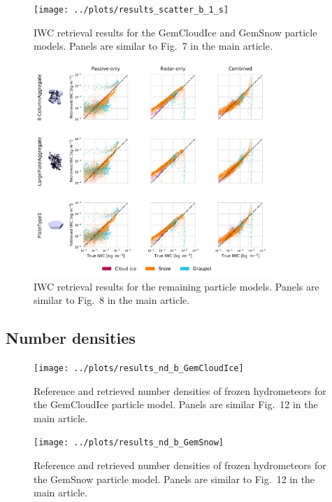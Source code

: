 \documentclass[journal abbreviation, manuscript]{copernicus}
\begin{document}
\begin{figure}[!hbpt]
\centering
\texttt{[image: ../plots/results\_scatter\_b\_1\_s]}
\caption{IWC retrieval results for the GemCloudIce and GemSnow particle models. Panels
  are similar to Fig.~7 in the main article.}
\end{figure}
\clearpage

\begin{figure}[!hbpt]
\centering
\includegraphics[width = 0.8\textwidth]{../plots/results_scatter_b_2}
\caption{IWC retrieval results for the remaining particle models. Panels
  are similar to Fig.~8 in the main article.}
\end{figure}
\clearpage

\subsection{Number densities}

\begin{figure}[!hbpt]
\centering
\texttt{[image: ../plots/results\_nd\_b\_GemCloudIce]}
\caption{Reference and retrieved number densities of frozen hydrometeors for the
  GemCloudIce particle model. Panels are similar Fig.~12 in the main article.}
\end{figure}
\clearpage

\begin{figure}[!hbpt]
\centering
\texttt{[image: ../plots/results\_nd\_b\_GemSnow]}
\caption{Reference and retrieved number densities of frozen hydrometeors for the
  GemSnow particle model. Panels are similar to Fig.~12 in the main article.}
\end{figure}
\clearpage
\end{document}
